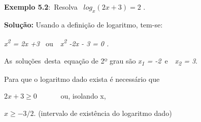 \documentclass[12pt]{article}
\begin{document}
\begin{enumerate}[label*={\fontsize{14pt}{14pt}\selectfont \textbf{\arabic*.}}]
\begin{adjustwidth}{0.49in}{0.0in}
\end{adjustwidth}


\vspace{\baselineskip}
\begin{justify}
\textbf{Exemplo 5.2}:\ Resolva  \   \( log_{x} \left( 2x+3 \right) =2 \) .
\end{justify}\par

\begin{justify}
\textbf{Solução: }Usando a definição de logaritmo, tem-se:
\end{justify}\par

\begin{adjustwidth}{0.49in}{0.0in}
\begin{justify}
\textit{x\textsuperscript{2} = 2x +3 \  }ou\ \  \textit{x\textsuperscript{2} -2x - 3 = 0  .}
\end{justify}\par

\end{adjustwidth}

\begin{justify}
As\ soluções\ desta\ equação de 2º grau são    \textit{x\textsubscript{1} = -2}\  e\ \  \textit{x\textsubscript{2} = 3}. 
\end{justify}\par

\begin{adjustwidth}{0.49in}{0.0in}
\begin{justify}
Para que o logaritmo dado exista é necessário que
\end{justify}\par

\end{adjustwidth}

\begin{adjustwidth}{0.49in}{0.0in}
\begin{justify}
\tab  \( 2x+3 \geq 0 \) \ \ \ \ \ \  ou, isolando x,
\end{justify}\par

\end{adjustwidth}

\begin{adjustwidth}{0.49in}{0.0in}
\begin{justify}
  \( x \geq -3/2. \) \tab (intervalo de existência do logaritmo dado)
\end{justify}\par


\end{adjustwidth}
\end{enumerate}
\end{document}
